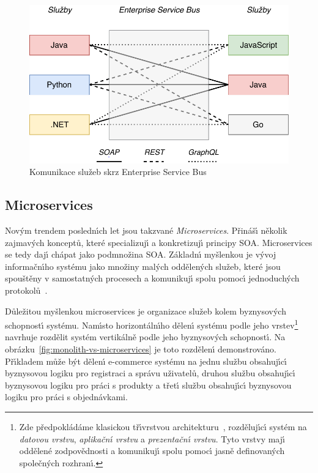 \begin{figure}
    \centering
    \includegraphics[keepaspectratio=true, width=0.7\linewidth]{figures/enterprise-service-bus.pdf}
    \caption{Komunikace služeb skrz Enterprise Service Bus}
    \label{fig:enterprise-service-bus}
\end{figure}

\subsection{Microservices}

Nov\'ym trendem posledn\'{\i}ch let jsou takzvané \textit{Microservices}.
Přináš\'{\i} několik zajmav\'ych konceptů, které specializuj\'{\i} a konkretizuj\'{\i}
principy \gls{SOA}. Microservices se tedy daj\'{\i} chápat jako podmnožina
\gls{SOA}. Základn\'{\i} myšlenkou je v\'yvoj informačn\'{\i}ho systému jako množiny
mal\'ych oddělen\'ych služeb, které jsou spouštěny v samostatn\'ych procesech
a komunikuj\'{\i} spolu pomoc\'{\i} jednoduch\'ych protokolů~\cite{lewis2014microservices}.

Důležitou myšlenkou microservices je organizace služeb kolem
byznysov\'ych schopnost\'{\i} systému. Nam\'{\i}sto horizontáln\'{\i}ho dělen\'{\i} systému
podle jeho vrstev\footnote{
Zde předpokládáme klasickou tř\'{\i}vrstvou architekturu~\cite{fowler2002patterns},
rozděluj\'{\i}c\'{\i} systém na \textit{datovou vrstvu}, \textit{aplikačn\'{\i} vrstvu}
a \textit{prezentačn\'{\i} vrstvu}. Tyto vrstvy maj\'{\i} oddělené zodpovědnosti a komunikuj\'{\i}
spolu pomoc\'{\i} jasně definovan\'ych společn\'ych rozhran\'{\i}.
} navrhuje rozdělit systém vertikálně podle jeho byznysov\'ych schopnost\'{\i}.
Na obrázku~\ref{fig:monolith-vs-microservices} je toto rozdělen\'{\i} demonstrováno.
Př\'{\i}kladem může b\'yt dělen\'{\i} e-commerce systému na jednu službu obsahuj\'{\i}c\'{\i} byznysovou
logiku pro registraci a správu uživatelů, druhou službu obsahuj\'{\i}c\'{\i} byznysovou logiku
pro práci s produkty a třet\'{\i} službu obsahuj\'{\i}c\'{\i} byznysovou logiku pro práci
s objednávkami.

